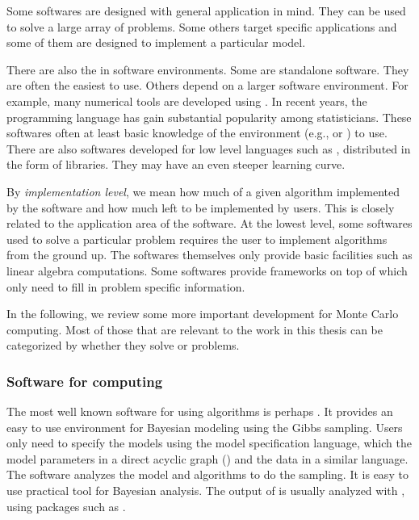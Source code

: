Some softwares are designed with general application in mind. They can be used to solve a large array of problems. Some others target specific applications and some of them are designed to implement a particular model.

There are also the  in software environments. Some are standalone software. They are often the easiest to use. Others depend on a larger software environment. For example, many numerical tools are developed using \matlab \cite{matlab}. In recent years, the \rlang programming language \cite{rlang} has gain substantial popularity among statisticians. These softwares often  at least basic knowledge of the environment (e.g., \matlab or \rlang) to use. There are also softwares developed for low level languages such as \cpp, distributed in the form of libraries. They may have an even steeper learning curve.

By \emph{implementation level}, we mean how much of a given algorithm  implemented by the software and how much  left to be implemented by users. This is closely related to the application area of the software. At the lowest level, some softwares used to solve a particular problem requires the user to implement algorithms from the ground up. The softwares themselves only provide basic facilities such as linear algebra computations. Some softwares provide frameworks on top of which  only need to fill in problem specific information.

In the following, we review some more important development for Monte Carlo computing. Most of those that are relevant to the work in this thesis can be categorized by whether they solve \mcmc or \smc problems.

\subsubsection{Software for \protect\mcmc computing}
\label{ssub:Softwares for mcmc computing}

The most well known software for using \mcmc algorithms is perhaps \bugs \cite{bugs, bugsbook}. It provides an easy to use environment for Bayesian modeling using the Gibbs sampling. Users only need to specify the models using the \bugs model specification language, which  the model parameters in a direct acyclic graph (\dag) and the data in a similar language. The software analyzes the model and  \mcmc algorithms to do the sampling. It is  easy to use practical tool for Bayesian analysis. The output of \bugs is usually analyzed with \rlang, using packages such as \rcoda \cite{rcoda}.

